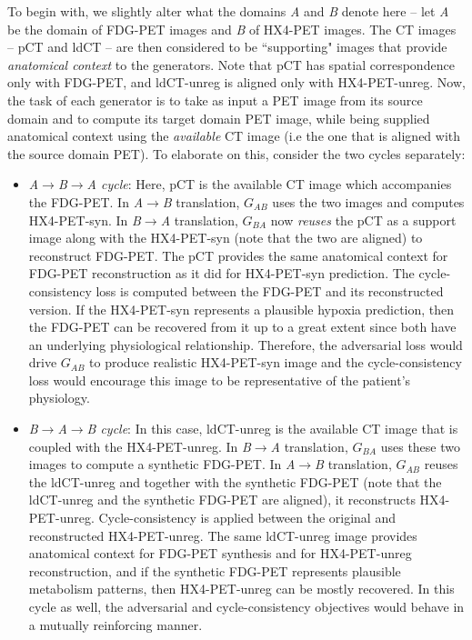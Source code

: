 To begin with, we slightly alter what the domains \textit{A} and \textit{B} denote here -- let \textit{A} be the domain of FDG-PET images and \textit{B} of HX4-PET images. The CT images -- pCT and ldCT -- are then considered to be ``supporting" images that provide \textit{anatomical context} to the generators. Note that pCT has spatial correspondence only with FDG-PET, and ldCT-unreg is aligned only with HX4-PET-unreg. Now, the task of each generator is to take as input a PET image from its source domain and to compute its target domain PET image, while being supplied anatomical context using the \textit{available} CT image (i.e the one that is aligned with the source domain PET). To elaborate on this, consider the two cycles separately: 

\begin{itemize}
    \item \textit{A$\rightarrow$B$\rightarrow$A cycle}: Here, pCT is the available CT image which accompanies the FDG-PET. In \textit{A}$\rightarrow$\textit{B} translation, $G_{AB}$ uses the two images and computes HX4-PET-syn. In \textit{B}$\rightarrow$\textit{A} translation, $G_{BA}$ now \textit{reuses} the pCT as a support image along with the HX4-PET-syn (note that the two are aligned) to reconstruct FDG-PET. The pCT provides the same anatomical context for FDG-PET reconstruction as it did for HX4-PET-syn prediction. The cycle-consistency loss is computed between the FDG-PET and its reconstructed version. If the HX4-PET-syn represents a plausible hypoxia prediction, then the FDG-PET can be recovered from it up to a great extent since both have an underlying physiological relationship. Therefore, the adversarial loss would drive $G_{AB}$ to produce realistic HX4-PET-syn image and the cycle-consistency loss would encourage this image to be representative of the patient's physiology. 
    
    \item \textit{B$\rightarrow$A$\rightarrow$B cycle}: In this case, ldCT-unreg is the available CT image that is coupled with the HX4-PET-unreg. In \textit{B}$\rightarrow$\textit{A} translation, $G_{BA}$ uses these two images to compute a synthetic FDG-PET. In \textit{A}$\rightarrow$\textit{B} translation, $G_{AB}$ reuses the ldCT-unreg and together with the synthetic FDG-PET (note that the ldCT-unreg and the synthetic FDG-PET are aligned), it reconstructs HX4-PET-unreg. Cycle-consistency is applied between the original and reconstructed HX4-PET-unreg. The same ldCT-unreg image provides anatomical context for FDG-PET synthesis and for HX4-PET-unreg reconstruction, and if the synthetic FDG-PET represents plausible metabolism patterns, then HX4-PET-unreg can be mostly recovered. In this cycle as well, the adversarial and cycle-consistency objectives would behave in a mutually reinforcing manner.
\end{itemize}

